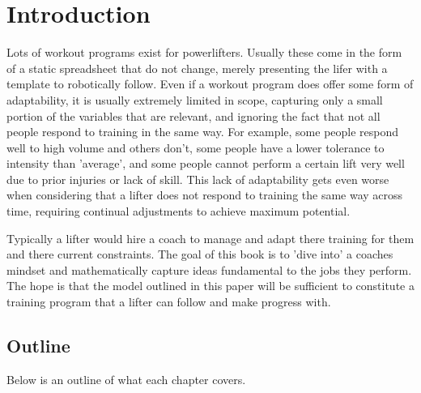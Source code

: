 \chapter{Introduction}
\label{sec:Introduction}

Lots of workout programs exist for powerlifters. Usually these come in the form of a static spreadsheet that do not change, merely presenting the lifer with a template to robotically follow. Even if a workout program does offer some form of adaptability, it is usually extremely limited in scope, capturing only a small portion of the variables that are relevant, and ignoring the fact that not all people respond to training in the same way. For example, some people respond well to high volume and others don't, some people have a lower tolerance to intensity than 'average', and some people cannot perform a certain lift very well due to prior injuries or lack of skill. This lack of adaptability gets even worse when considering that a lifter does not respond to training the same way across time, requiring continual adjustments to achieve maximum potential.

Typically a lifter would hire a coach to manage and adapt there training for them and there current constraints. The goal of this book is to 'dive into' a coaches mindset and mathematically capture ideas fundamental to the jobs they perform. The hope is that the model outlined in this paper will be sufficient to constitute a training program that a lifter can follow and make progress with.

\section{Outline}
\label{sec:Outline}

Below is an outline of what each chapter covers.

